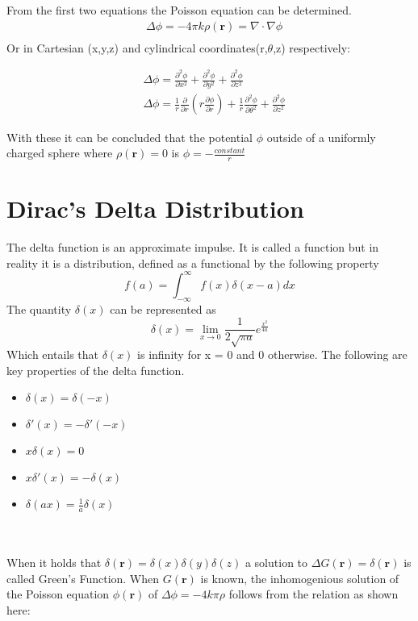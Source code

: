 \noindent From the first two equations the Poisson equation can be determined.
\begin{equation}
\begin{aligned}
   &\Delta \phi = -4\pi k \rho(\textbf{r}) = \nabla \cdot \nabla \phi\\
\end{aligned}
\end{equation}
\noindent Or in Cartesian (x,y,z) and cylindrical coordinates(r,$\theta$,z) respectively:

\begin{equation}
    \begin{aligned}
    &\Delta \phi = \frac{\partial^2 \phi}{\partial x^2} + \frac{\partial^2 \phi}{\partial y^2} + \frac{\partial^2 \phi}{\partial z^2}\\
    &\Delta \phi= \frac{1}{r}\frac{\partial}{\partial r}\left(r\frac{\partial \phi}{\partial r}\right) + \frac{1}{r}\frac{\partial^2 \phi}{\partial \theta^2} + \frac{\partial^2 \phi}{\partial z^2}
    \end{aligned}
\end{equation}

\noindent With these it can be concluded that the potential $\phi$ outside of a uniformly charged sphere where $\rho(\textbf{r}) = 0$ is $\phi = - \frac{constant}{r}$


\section{Dirac's Delta Distribution}
The delta function is an approximate impulse. It is called a function but in reality it is a distribution, defined as a functional by the following property
\begin{equation}
    f(a) =  \int_{-\infty}^\infty f(x)\delta(x-a)dx
\end{equation}
The quantity $\delta(x)$ can be represented as
\begin{equation}
    \delta (x) = \lim_{x\to 0} \frac{1}{2\sqrt{\pi a}}e^{\frac{x^2}{4a}}
\end{equation}
Which entails that $\delta(x)$ is infinity for x = 0 and 0 otherwise. The following are key properties of the delta function.
\begin{itemize}
    \item $\delta(x) = \delta(-x)$
    \item $\delta'(x) = - \delta'(-x)$
    \item $x\delta(x) = 0$
    \item $x\delta'(x) = -\delta(x)$
    \item $\delta(ax) = \frac{1}{a} \delta(x)$
\end{itemize} \\
\\
\noindent When it holds that $\delta(\textbf{r}) = \delta(x)\delta(y)\delta(z)$ a solution to $\Delta G(\textbf{r}) = \delta(\textbf{r}) $ is called Green's Function. When $G(\textbf{r})$ is known, the inhomogenious solution of the Poisson equation $\phi(\textbf{r})$ of $\Delta\phi = -4k\pi \rho$ follows from the relation as shown here:

